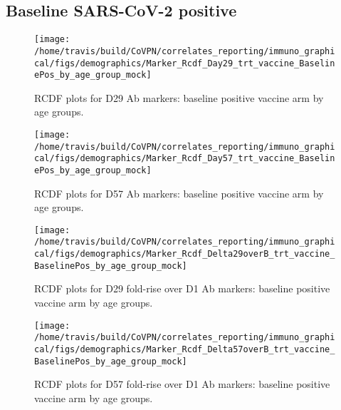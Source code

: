\documentclass[]{book}
\theoremstyle{definition}
\theoremstyle{definition}
\theoremstyle{definition}
\newcommand{\1}{\mathbbm{1}}
\begin{document}
\clearpage

\hypertarget{baseline-sars-cov-2-positive-4}{%
\subsection{Baseline SARS-CoV-2 positive}\label{baseline-sars-cov-2-positive-4}}

\begin{figure}[H]

{\centering \texttt{[image: /home/travis/build/CoVPN/correlates\_reporting/immuno\_graphical/figs/demographics/Marker\_Rcdf\_Day29\_trt\_vaccine\_BaselinePos\_by\_age\_group\_mock]} 

}

\caption{RCDF plots for D29 Ab markers: baseline positive vaccine arm by age groups.}\label{fig:unnamed-chunk-92}
\end{figure}

\clearpage
\begin{figure}[H]

{\centering \texttt{[image: /home/travis/build/CoVPN/correlates\_reporting/immuno\_graphical/figs/demographics/Marker\_Rcdf\_Day57\_trt\_vaccine\_BaselinePos\_by\_age\_group\_mock]} 

}

\caption{RCDF plots for D57 Ab markers: baseline positive vaccine arm by age groups.}\label{fig:unnamed-chunk-93}
\end{figure}

\clearpage
\begin{figure}[H]

{\centering \texttt{[image: /home/travis/build/CoVPN/correlates\_reporting/immuno\_graphical/figs/demographics/Marker\_Rcdf\_Delta29overB\_trt\_vaccine\_BaselinePos\_by\_age\_group\_mock]} 

}

\caption{RCDF plots for D29 fold-rise over D1 Ab markers: baseline positive vaccine arm by age groups.}\label{fig:unnamed-chunk-94}
\end{figure}

\clearpage
\begin{figure}[H]

{\centering \texttt{[image: /home/travis/build/CoVPN/correlates\_reporting/immuno\_graphical/figs/demographics/Marker\_Rcdf\_Delta57overB\_trt\_vaccine\_BaselinePos\_by\_age\_group\_mock]} 

}

\caption{RCDF plots for D57 fold-rise over D1 Ab markers: baseline positive vaccine arm by age groups.}\label{fig:unnamed-chunk-95}
\end{figure}
\end{document}
